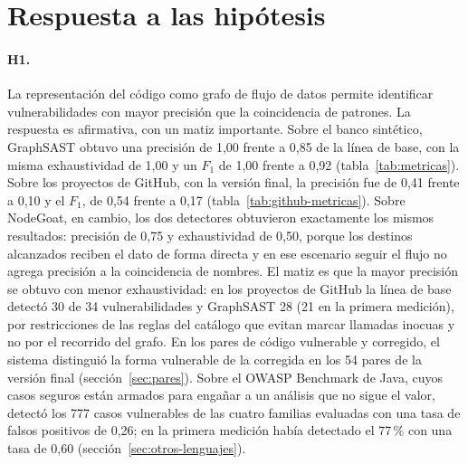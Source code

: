 \section{Respuesta a las hipótesis}\label{sec:respuesta-hipotesis}

\paragraph{H1.} La representación del código como grafo de flujo de
datos permite identificar vulnerabilidades con mayor precisión que la
coincidencia de patrones. La respuesta es afirmativa, con un matiz
importante. Sobre el banco sintético, GraphSAST obtuvo una precisión de
1,00 frente a 0,85 de la línea de base, con la misma exhaustividad de
1,00 y un $F_1$ de 1,00 frente a 0,92 (tabla~\ref{tab:metricas}). Sobre
los proyectos de GitHub, con la versión final, la precisión fue de 0,41
frente a 0,10 y el $F_1$, de 0,54 frente a 0,17
(tabla~\ref{tab:github-metricas}). Sobre
NodeGoat, en cambio, los dos detectores obtuvieron exactamente los mismos
resultados: precisión de 0,75 y exhaustividad de 0,50, porque los
destinos alcanzados reciben el dato de forma directa y en ese escenario
seguir el flujo no agrega precisión a la coincidencia de nombres. El
matiz es que la mayor precisión se obtuvo con menor exhaustividad: en los
proyectos de GitHub la línea de base detectó 30 de 34 vulnerabilidades y
GraphSAST 28 (21 en la primera medición), por restricciones de las
reglas del catálogo que evitan marcar llamadas inocuas y no por el
recorrido del grafo. En los pares de código vulnerable y corregido, el
sistema distinguió la forma vulnerable de la corregida en los 54 pares
de la versión final (sección~\ref{sec:pares}). Sobre el OWASP Benchmark
de Java, cuyos casos seguros están armados para engañar a un análisis que
no sigue el valor, detectó los 777 casos vulnerables de las cuatro
familias evaluadas con una tasa de falsos positivos de 0,26; en la
primera medición había detectado el 77\,\% con una tasa de 0,60
(sección~\ref{sec:otros-lenguajes}).


